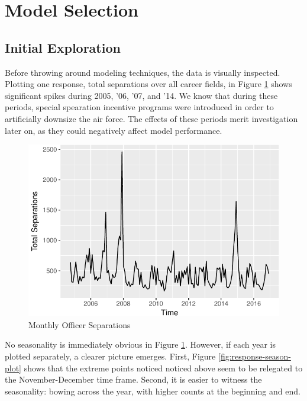 \documentclass[12pt,letterpaper,toc=flat,oneside]{report}
\theoremstyle{definition}
\theoremstyle{definition}
\theoremstyle{definition}
\theoremstyle{remark}
\begin{document}
\hypertarget{model-selection}{%
\section{Model Selection}\label{model-selection}}

\hypertarget{initial-exploration}{%
\subsection{Initial Exploration}\label{initial-exploration}}

Before throwing around modeling techniques, the data is visually
inspected. Plotting one response, total separations over all career
fields, in Figure \ref{fig:response-plot} shows significant spikes
during 2005, '06, '07, and '14. We know that during these periods,
special spearation incentive programs were introduced in order to
artificially downsize the air force. The effects of these periods merit
investigation later on, as they could negatively affect model
performance.

\begin{figure}[H]

{\centering \includegraphics{elliott-econometric-personnel-retention-18_files/figure-latex/response-plot-1} 

}

\caption{Monthly Officer Separations}\label{fig:response-plot}
\end{figure}

No seasonality is immediately obvious in Figure \ref{fig:response-plot}.
However, if each year is plotted separately, a clearer picture emerges.
First, Figure \ref{fig:response-season-plot} shows that the extreme
points noticed noticed above seem to be relegated to the
November-December time frame. Second, it is easier to witness the
seasonality: bowing across the year, with higher counts at the beginning
and end.
\end{document}
